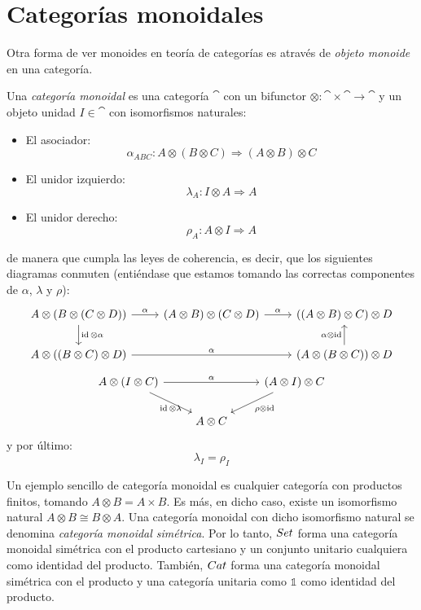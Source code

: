 \section{Categorías monoidales}
Otra forma de ver monoides en teoría de categorías es através de \emph{objeto monoide} en una categoría.

\begin{definition}
Una \emph{categoría monoidal} es una categoría $\cat$ con un bifunctor $\otimes \colon \cat \times \cat \to \cat$ y un objeto unidad $I \in \cat$ con isomorfismos naturales:
\begin{itemize}
  \item El asociador:
\[ \alpha_{ABC} \colon A \otimes (B \otimes C) \Rightarrow (A \otimes B) \otimes C \]
  \item El unidor izquierdo:
\[ \lambda_A \colon I \otimes A \Rightarrow A \]
  \item El unidor derecho:
\[ \rho_A \colon A \otimes I \Rightarrow A \]
\end{itemize}
de manera que cumpla las leyes de coherencia, es decir, que los siguientes diagramas conmuten (entiéndase que estamos tomando las correctas componentes de $\alpha$, $\lambda$ y $\rho$):
\[\begin{tikzcd}
{A \otimes (B \otimes (C \otimes D))} \arrow[r,"\alpha"] \arrow[d,"\id\otimes\alpha"] & {(A \otimes B) \otimes (C \otimes D)} \arrow[r,"\alpha"] & {((A \otimes B) \otimes C) \otimes D}\\
{A \otimes ((B \otimes C) \otimes D)} \arrow[rr,"\alpha"] & & {(A \otimes (B \otimes C)) \otimes D} \arrow[u,"\alpha\otimes\id"]
\end{tikzcd}\]
\[\begin{tikzcd}
{A \otimes (I \otimes C)} \arrow[dr,"\id \otimes \lambda" below] \arrow[rr,"\alpha"] & & {(A \otimes I) \otimes C} \arrow[dl,"\rho \otimes \id"]\\
& {A \otimes C}
\end{tikzcd}\]
y por último:
\[ \lambda_I = \rho_I \]
\end{definition}

Un ejemplo sencillo de categoría monoidal es cualquier categoría con productos finitos, tomando $A \otimes B = A \times B$.
Es más, en dicho caso, existe un isomorfismo natural $A \otimes B \cong B \otimes A$.
Una categoría monoidal con dicho isomorfismo natural se denomina \emph{categoría monoidal simétrica}.
Por lo tanto, ${Set}$ forma una categoría monoidal simétrica con el producto cartesiano y un conjunto unitario cualquiera como identidad del producto.
También, ${Cat}$ forma una categoría monoidal simétrica con el producto y una categoría unitaria como $\mathbb{1}$ como identidad del producto.


